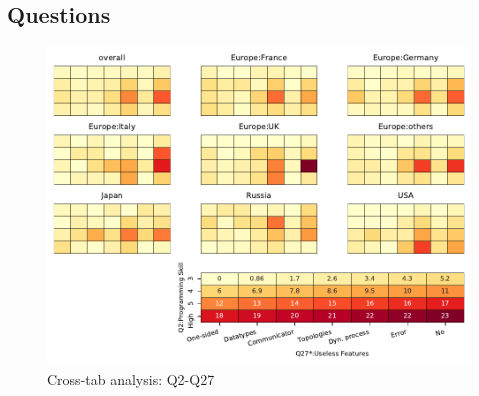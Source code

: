 
\subsection{Questions}


\begin{figure}
\begin{center}
\includegraphics[width=12cm]{../pdfs/Q2-Q27.pdf}
\caption{Cross-tab analysis: Q2-Q27}
\label{fig:Q2-Q27}
\end{center}
\end{figure}
